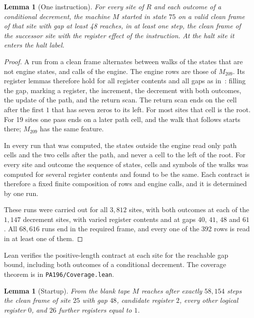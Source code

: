 \documentclass[11pt,letterpaper]{article}
\newtheorem{lemma}[theorem]{Lemma}
\newcommand{\file}[1]{\texttt{\nolinkurl{#1}}}
\begin{document}
\begin{lemma}[One instruction]\label{lem:contract}
For every site of $R$ and each outcome of a conditional decrement,
the machine $M$ started in state $75$ on a valid clean frame of
that site with gap at least 48 reaches, in at least one step, the clean frame of the
successor site with the register effect of the instruction. At the
halt site it enters the halt label.
\end{lemma}

\begin{proof}
A run from a clean frame alternates between walks of the states that
are not engine states, and calls of the engine. The engine rows are
those of $M_{209}$. Its register lemmas therefore hold for all
register contents and all gaps as in~\cite[\S3]{pa209}: filling the
gap, marking a register, the increment, the decrement with both
outcomes, the update of the path, and the return scan. The return scan
ends on the cell after the first $1$ that has seven zeros to its left.
For most sites that cell is the root. For 19 sites one pass ends on a
later path cell, and the walk that follows starts there; $M_{209}$ has
the same feature.

In every run that was computed, the states outside the engine read
only path cells and the two cells after the path, and never a cell to
the left of the root. For every site and outcome the sequence of
states, cells and symbols of the walks was computed for several
register contents and found to be the same. Each contract is therefore
a fixed finite composition of rows and engine calls, and it is
determined by one run.

These runs were carried out for all $3{,}812$ sites, with both
outcomes at each of the $1{,}147$ decrement sites, with varied
register contents and at gaps $40$, $41$, $48$ and $61$. All
$68{,}616$ runs end in the required frame, and every one of the 392
rows is read in at least one of them.
\end{proof}

Lean verifies the positive-length contract at each site for the
reachable gap bound, including both outcomes of a conditional
decrement. The coverage theorem is in \file{PA196/Coverage.lean}.

\begin{lemma}[Startup]\label{lem:startup}
From the blank tape $M$ reaches after exactly $58{,}154$ steps the
clean frame of site $25$ with gap $48$, candidate register $2$, every
other logical register $0$, and $26$ further registers equal to $1$.
\end{lemma}
\end{document}

